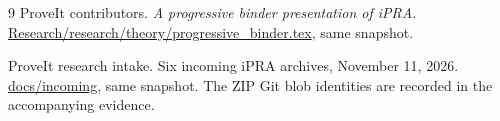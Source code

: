 \begin{thebibliography}{9}
ProveIt contributors.
\emph{A progressive binder presentation of iPRA}.
\href{https://github.com/VladimirReshetnikov/ProveIt/blob/a4e5e96c456303cf231eab2aeeb3291d8889833f/Logic/PrimitiveRecursiveArithmetic/ConciseIPRA/Research/research/theory/progressive_binder.tex}{Research/research/theory/progressive\_binder.tex}, same snapshot.

ProveIt research intake.
Six incoming iPRA archives, November 11, 2026.
\href{https://github.com/VladimirReshetnikov/ProveIt/tree/a4e5e96c456303cf231eab2aeeb3291d8889833f/Logic/PrimitiveRecursiveArithmetic/ConciseIPRA/docs/incoming}{docs/incoming}, same snapshot.
The ZIP Git blob identities are recorded in the accompanying evidence.
\end{thebibliography}
